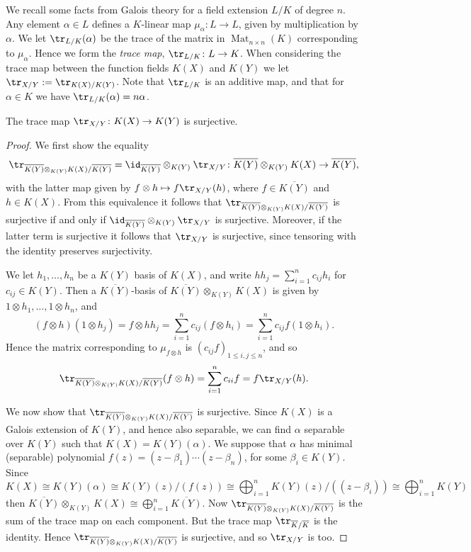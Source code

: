 We recall some facts from Galois theory for a field extension $L/K$ of degree $n$.
Any element $\alpha \in L$ defines a $K$-linear map $\mu_{\alpha} \colon  L \rightarrow L$, given by multiplication by $\alpha$.
We let $\tr_{L/K}(\alpha)$ be the trace of the matrix in $\operatorname{Mat}_{n \times n}(K)$ corresponding to $\mu_\alpha$.
Hence we form the {\em trace map}, $\tr_{L/K}\colon L \ra K$.
When considering the trace map between the function fields $K(X)$ and $K(Y)$ we let $\tr_{X/Y} := \tr_{K(X)/K(Y)}$.
Note that $\tr_{L/K}$ is an additive map, and that for $\alpha \in K$ we have $\tr_{L/K}(\alpha) = n \alpha$.
    \begin{prop}\label{proptracelemmasurjective}
    The trace map $\tr_{X/Y} \colon K(X) \ra K(Y)$ is surjective.
    \end{prop}
    \begin{proof}
    We first show the equality 
        \[
        \tr_{\overline{K(Y)}\otimes_{K(Y)}K(X)/\overline{K(Y)}} = \id_{\overline{K(Y)}}\otimes _{K(Y)} \tr_{X/Y} \colon \overline{K(Y)}\otimes_{K(Y)}K(X) \ra \overline{K(Y)},
        \]
    with the latter map given by $f\otimes h \mapsto f\tr_{X/Y}(h)$, where $f \in \overline{K(Y)}$ and $ h \in K(X)$.
    From this equivalence it follows that $\tr_{\overline{K(Y)}\otimes_{K(Y)}K(X)/\overline{K(Y)}}$ is surjective if and only if $\id_{\overline{K(Y)}}\otimes _{K(Y)} \tr_{X/Y}$ is surjective.
    Moreover, if the latter term is surjective it follows that $\tr_{X/Y}$ is surjective, since tensoring with the identity preserves surjectivity.
            
    We let $h_1, \ldots, h_n$ be a $K(Y)$ basis of $K(X)$, and write $hh_j = \sum_{i=1}^n c_{ij}h_i$ for $c_{ij} \in K(Y)$.
    Then a $\overline{K(Y)}$-basis of $\overline{K(Y)}\otimes_{K(Y)}K(X)$ is given by $1 \otimes h_1, \ldots, 1 \otimes h_n$, and 
        \[
        (f \otimes h)(1\otimes h_j) = f \otimes hh_j = \sum_{i=1}^n c_{ij}(f \otimes h_i) = \sum_{i=1}^n c_{ij}f(1 \otimes h_i).
        \]  
    Hence the matrix corresponding to $\mu_{f \otimes h}$ is $(c_{ij}f)_{1 \leq i,j \leq n}$, and so
        \[
        \tr_{\overline{K(Y)}\otimes_{K(Y)}K(X)/\overline{K(Y)}}(f \otimes h) = \sum_{i=1}^n c_{ii}f = f \tr_{X/Y}(h).
        \]  

    We now show that $\tr_{\overline{K(Y)}\otimes_{K(Y)}K(X)/\overline{K(Y)}}$ is surjective.
    Since $K(X)$ is a Galois extension of $K(Y)$, and hence also separable, we can find $\alpha$ separable over $K(Y)$ such that $K(X) = K(Y)(\alpha)$.
    We suppose that $\alpha$ has minimal (separable) polynomial $f(z) = (z - \beta_1)\cdots (z - \beta_n)$, for some $\beta_i \in K(Y)$.
    Since
        \[
        K(X) \cong K(Y)(\alpha) \cong K(Y)(z)/(f(z)) \cong \bigoplus_{i=1}^n K(Y)(z)/((z-\beta_i)) \cong \bigoplus_{i=1}^n K(Y)
        \]  
    then $\overline{K(Y)}\otimes_{K(Y)} K(X) \cong \bigoplus_{i=1}^n \overline{K(Y)}$.
    Now $\tr_{\overline{K(Y)}\otimes_{K(Y)}K(X)/\overline{K(Y)}}$ is the sum of the trace map on each component.
    But the trace map $\tr_{\overline{K}/\overline{K}}$ is the identity.
    Hence $\tr_{\overline{K(Y)}\otimes_{K(Y)}K(X)/\overline{K(Y)}}$ is surjective, and so $\tr_{X/Y}$ is too.
    \end{proof}

